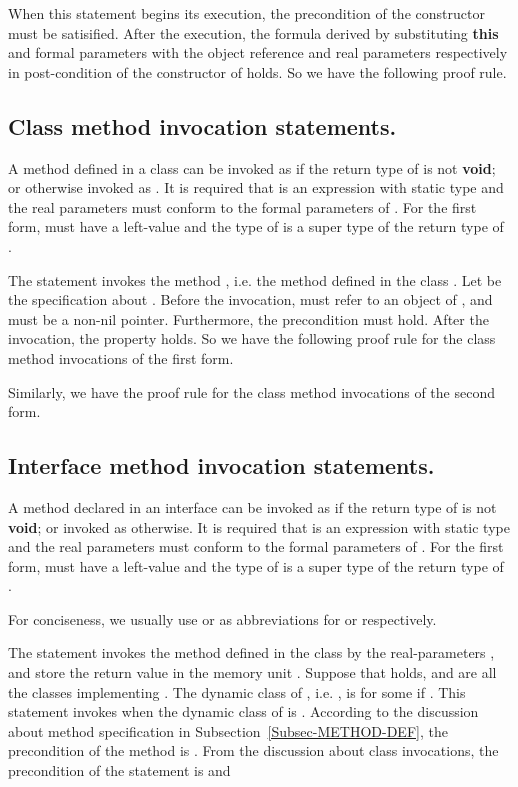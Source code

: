 \documentclass[fleqn]{llncs}
\begin{document}
When this statement begins its execution, the precondition of the constructor must be satisified.
After the execution,
the formula derived by substituting \textbf{this} and formal parameters with the object reference and real parameters respectively in post-condition of the constructor of  holds.  So we have the following proof rule.
    


\subsection{Class method invocation statements.}
A method  defined in a class  can be invoked as   if the return type of  is not \textbf{void};
or otherwise invoked as .
It is required that  is an expression with static type  and the real parameters  must conform to the formal parameters of .
For the first form,  must have a left-value and the type of  is a super type of the return type of .

The statement  invokes the method , i.e. the method  defined in the class .
Let  be the specification about .
Before the invocation,   must refer to an object of , and  must be a non-nil pointer. Furthermore,
the precondition  must hold. After the invocation, the property
 holds.
So we have the following proof rule for the class method invocations of the first form.

Similarly, we have the proof rule for the class method invocations of the second form.


\subsection{Interface method invocation statements.}
A method  declared in an interface  can be invoked as   if the return type of  is not \textbf{void};
or invoked as  otherwise.
It is required that  is an expression with static type  and the real parameters  must conform to the formal parameters of .
For the first form,  must have a left-value and the type of  is a super type of the return type of .

For conciseness, we usually use  or  as abbreviations for  or
 respectively.

The statement   invokes the method  defined in the class  by the real-parameters , and store
the return value in the memory unit . Suppose that  holds, and  are all the classes implementing .
The dynamic class of , i.e. , is   for some   if .
This statement invokes  when the dynamic class of  is .
According to the discussion about method specification in Subsection~\ref{Subsec-METHOD-DEF},
the precondition of the method  is . From the discussion about class invocations,
the precondition of the statement is  and
\end{document}
